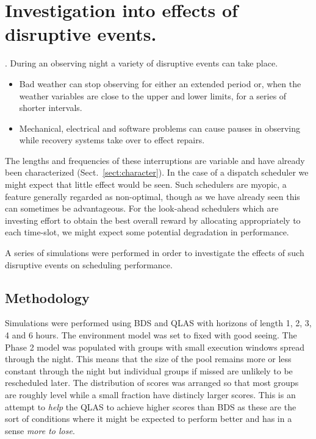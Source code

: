 \section{Investigation into effects of disruptive events.}
\label{sect:exp_disruption}

. During an observing night a variety of disruptive events can take place. 
\begin{itemize}
\item Bad weather can stop observing for either an extended period or, when the weather variables are close to the upper and lower limits, for a series of shorter intervals.
\item Mechanical, electrical and software problems can cause pauses in observing while recovery systems take over to effect repairs.
\end{itemize}

The lengths and frequencies of these interruptions are variable and have already been characterized (Sect.~\ref{sect:character}). In the case of a dispatch scheduler we might expect that little effect would be seen. Such schedulers are myopic, a feature generally regarded as non-optimal, though as we have already seen this can sometimes be advantageous. For the look-ahead schedulers which are investing effort to obtain the best overall reward by allocating appropriately to each time-slot, we might expect some potential degradation in performance.

A series of simulations were performed in order to investigate the effects of such disruptive events on scheduling performance.

\subsection{Methodology}
Simulations were performed using BDS and QLAS with horizons of length 1, 2, 3, 4 and 6 hours. The environment model was set to fixed with good seeing. The Phase 2 model was populated with groups with small execution windows spread through the night. This means that the size of the pool remains more or less constant through the night but individual groups if missed are unlikely to be rescheduled later. The distribution of scores was arranged so that most groups are roughly level while a small fraction have distincly larger scores. This is an attempt to \emph{help} the QLAS to achieve higher scores than BDS as these are the sort of conditions where it might be expected to perform better and has in a sense \emph{more to lose}.

